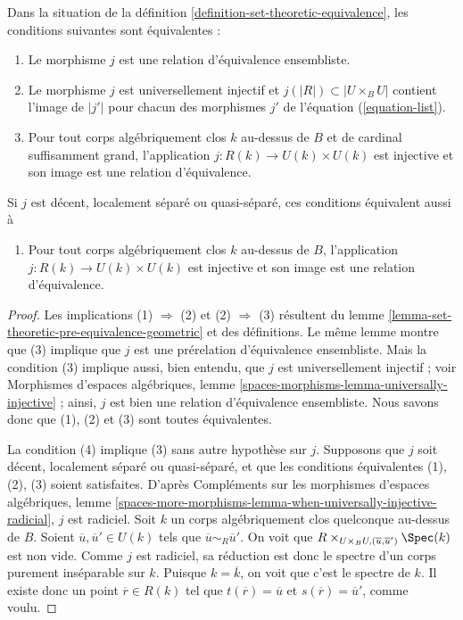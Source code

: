 \begin{lemma}
\label{lemma-set-theoretic-equivalence-geometric}
Dans la situation de la définition \ref{definition-set-theoretic-equivalence},
les conditions suivantes sont équivalentes :
\begin{enumerate}
\item Le morphisme $j$ est une relation d'équivalence ensembliste.
\item Le morphisme $j$ est universellement injectif et
$j(|R|) \subset |U \times_B U|$ contient l'image de
$|j'|$ pour chacun des morphismes $j'$ de l'équation (\ref{equation-list}).
\item Pour tout corps algébriquement clos $k$ au-dessus de $B$ et de cardinal suffisamment grand,
l'application $j : R(k) \to U(k) \times U(k)$ est injective et
son image est une relation d'équivalence.
\end{enumerate}
Si $j$ est décent, localement séparé ou quasi-séparé,
ces conditions équivalent aussi à
\begin{enumerate}
\item[(4)] Pour tout corps algébriquement clos $k$ au-dessus de $B$,
l'application $j : R(k) \to U(k) \times U(k)$ est injective et son image
est une relation d'équivalence.
\end{enumerate}
\end{lemma}

\begin{proof}
Les implications (1) $\Rightarrow$ (2) et (2) $\Rightarrow$ (3) résultent du
lemme \ref{lemma-set-theoretic-pre-equivalence-geometric}
et des définitions. Le même lemme montre que (3) implique que
$j$ est une prérelation d'équivalence ensembliste. Mais la condition
(3) implique aussi, bien entendu, que $j$ est universellement injectif ; voir
Morphismes d'espaces algébriques, lemme \ref{spaces-morphisms-lemma-universally-injective} ;
ainsi, $j$ est bien une relation d'équivalence ensembliste.
Nous savons donc que (1), (2) et (3) sont toutes équivalentes.

\medskip\noindent
La condition (4) implique (3) sans autre hypothèse sur $j$. Supposons que $j$
soit décent, localement séparé ou quasi-séparé, et que les conditions équivalentes
(1), (2), (3) soient satisfaites. D'après
Compléments sur les morphismes d'espaces algébriques,
lemme \ref{spaces-more-morphisms-lemma-when-universally-injective-radicial},
$j$ est radiciel.
Soit $k$ un corps algébriquement clos quelconque au-dessus de $B$. Soient
$\overline{u}, \overline{u}' \in U(k)$ tels que
$\overline{u} \sim_R \overline{u}'$. On voit que
$R \times_{U \times_B U, (\overline{u}, \overline{u}')} \Spec(k)$
est non vide. Comme $j$ est radiciel, sa réduction est donc le spectre d'un
corps purement inséparable sur $k$. Puisque $k = \overline{k}$, on voit que
c'est le spectre de $k$. Il existe donc un point $\overline{r} \in R(k)$
tel que $t(\overline{r}) = \overline{u}$ et $s(\overline{r}) = \overline{u}'$,
comme voulu.
\end{proof}

